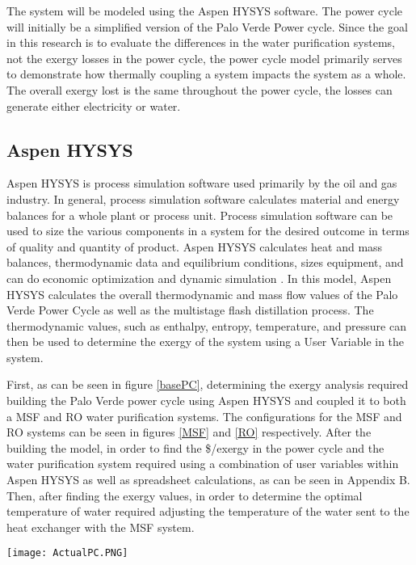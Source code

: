 The system will be modeled using the Aspen HYSYS software.  The power cycle will initially be a simplified version of the Palo Verde Power cycle.  Since the goal in this research is to evaluate the differences in the water purification systems, not the exergy losses in the power cycle, the power cycle model primarily serves to demonstrate how thermally coupling a system impacts the system as a whole. The overall exergy lost is the same throughout the power cycle, the losses can generate either electricity or water.

\subsection{Aspen HYSYS}

Aspen HYSYS is process simulation software used primarily by the oil and gas industry. In general, process simulation software calculates material and energy balances for a whole plant or process unit. Process simulation software can be used to size the various components in a system for the desired outcome in terms of quality and quantity of product. Aspen HYSYS calculates heat and mass balances, thermodynamic data and equilibrium conditions, sizes equipment, and can do economic optimization and dynamic simulation \cite{Oi2017}. In this model, Aspen HYSYS calculates the overall thermodynamic and mass flow values of the Palo Verde Power Cycle as well as the multistage flash distillation process. The thermodynamic values, such as enthalpy, entropy, temperature, and pressure can then be used to determine the exergy of the system using a User Variable in the system.

First, as can be seen in figure \ref{basePC}, determining the exergy analysis required building the Palo Verde power cycle using Aspen HYSYS and coupled it to both a MSF and RO water purification systems. The configurations for the MSF and RO systems can be seen in figures \ref{MSF} and \ref{RO} respectively. After the building the model, in order to find  the \$/exergy in the power cycle and the water purification system required using a combination of user variables within Aspen HYSYS as well as spreadsheet calculations, as can be seen in Appendix B. Then, after finding the exergy values, in order to determine the optimal temperature of water required adjusting the temperature of the water sent to the heat exchanger with the MSF system.  

 \begin{figure*}[h!]
\centering
\texttt{[image: ActualPC.PNG]}
\caption{\small \sl This is an image of Palo Verde's simplified Rankine cycle used for this research. The overall efficiency of the system is about 32\%, which is a reasonable approximation of the Palo Verde Power cycle.  The turbines are yellow, meaning warning, because of the liquid entering the turbines.  In reality, the turbines can still function with some liquid}
 \label{basePC}
\centering
\end{figure*}

